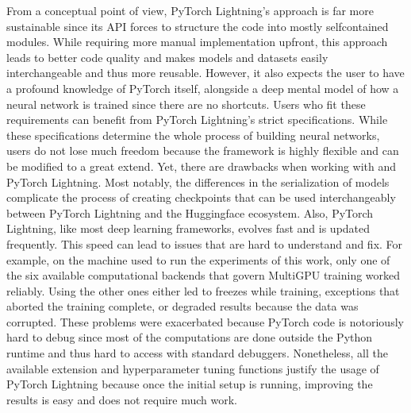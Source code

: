\documentclass[letterpaper,10pt,english]{jupyterBook}
\begin{document}
\sphinxAtStartPar
From a conceptual point of view, PyTorch Lightning’s approach is far more sustainable since its API forces to structure the code into mostly self\sphinxhyphen{}contained modules.
While requiring more manual implementation upfront, this approach leads to better code quality and makes models and datasets easily interchangeable and thus more reusable.
However, it also expects the user to have a profound knowledge of PyTorch itself, alongside a deep mental model of how a neural network is trained since there are no shortcuts.
Users who fit these requirements can benefit from PyTorch Lightning’s strict specifications.
While these specifications determine the whole process of building neural networks, users do not lose much freedom because the framework is highly flexible and can be modified to a great extend.
Yet, there are drawbacks when working with  and PyTorch Lightning.
Most notably, the differences in the serialization of models complicate the process of creating checkpoints that can be used interchangeably between PyTorch Lightning and the Huggingface ecosystem.
Also, PyTorch Lightning, like most deep learning frameworks, evolves fast and is updated frequently.
This speed can lead to issues that are hard to understand and fix.
For example, on the machine used to run the experiments of this work, only one of the six available computational backends that govern Multi\sphinxhyphen{}GPU training worked reliably.
Using the other ones either led to freezes while training, exceptions that aborted the training complete, or degraded results because the data was corrupted.
These problems were exacerbated because PyTorch code is notoriously hard to debug since most of the computations are done outside the Python runtime and thus hard to access with standard debuggers.
Nonetheless, all the available extension and hyperparameter tuning functions justify the usage of PyTorch Lightning because once the initial setup is running, improving the results is easy and does not require much work.
\end{document}
